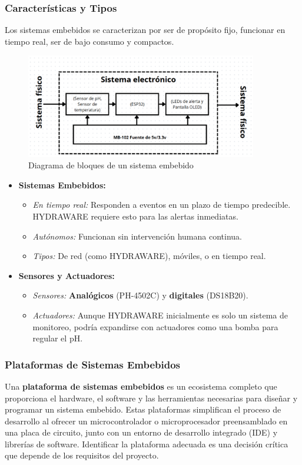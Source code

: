 \documentclass[a4paper,12pt]{article}
\begin{document}
	\subsubsection{Características y Tipos}
	Los sistemas embebidos se caracterizan por ser de propósito fijo, funcionar en tiempo real, ser de bajo consumo y compactos.
	\begin{figure}[h]
		\centering
		\includegraphics[width=0.9\textwidth]{diagrama.png}
		\caption{Diagrama de bloques de un sistema embebido}
	\end{figure}
	\begin{itemize}
		\item \textbf{Sistemas Embebidos:}
		\begin{itemize}
			\item \textit{En tiempo real:} Responden a eventos en un plazo de tiempo predecible. HYDRAWARE requiere esto para las alertas inmediatas.
			\item \textit{Autónomos:} Funcionan sin intervención humana continua.
			\item \textit{Tipos:} De red (como HYDRAWARE), móviles, o en tiempo real.
		\end{itemize}
		\item \textbf{Sensores y Actuadores:}
		\begin{itemize}
			\item \textit{Sensores:} \textbf{Analógicos} (PH-4502C) y \textbf{digitales} (DS18B20).
			\item \textit{Actuadores:} Aunque HYDRAWARE inicialmente es solo un sistema de monitoreo, podría expandirse con actuadores como una bomba para regular el pH.
		\end{itemize}
	\end{itemize}
		
	\subsubsection{Plataformas de Sistemas Embebidos}
	Una \textbf{plataforma de sistemas embebidos} es un ecosistema completo que proporciona el hardware, el software y las herramientas necesarias para diseñar y programar un sistema embebido. Estas plataformas simplifican el proceso de desarrollo al ofrecer un microcontrolador o microprocesador preensamblado en una placa de circuito, junto con un entorno de desarrollo integrado (IDE) y librerías de software. Identificar la plataforma adecuada es una decisión crítica que depende de los requisitos del proyecto.
	
\end{document}
